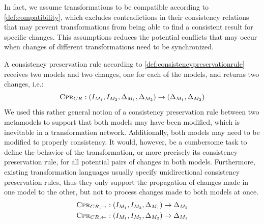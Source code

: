 In fact, we assume transformations to be compatible according to \autoref{def:compatibility}, which excludes contradictions in their consistency relations that may prevent transformations from being able to find a consistent result for specific changes.
This assumptions reduces the potential conflicts that may occur when changes of different transformations need to be synchronized.




A consistency preservation rule according to \autoref{def:consistencypreservationrule} receives two models and two changes, one for each of the models, and returns two changes, i.e.:
\begin{align*}
    \textsc{Cpr}_{CR_{}} : (I_{M_{1}}, I_{M_{2}}, \Delta_{M_{1}}, \Delta_{M_{2}}) \rightarrow (\Delta_{M_{1}}, \Delta_{M_{2}})
\end{align*}
We used this rather general notion of a consistency preservation rule between two metamodels to support that both models may have been modified, which is inevitable in a transformation network.
Additionally, both models may need to be modified to properly consistency.
It would, however, be a cumbersome task to define the behavior of the transformation, or more precisely its consistency preservation rule, for all potential pairs of changes in both models.
Furthermore, existing transformation languages usually specify unidirectional consistency preservation rules, thus they only support the propagation of changes made in one model to the other, but not to process changes made to both models at once.
\begin{align*}
    \textsc{Cpr}_{CR_{},\rightarrow} : (I_{M_{1}}, I_{M_{2}}, \Delta_{M_{1}}) \rightarrow \Delta_{M_{2}}\\
    \textsc{Cpr}_{CR_{},\leftarrow} : (I_{M_{1}}, I_{M_{2}}, \Delta_{M_{2}}) \rightarrow \Delta_{M_{1}}
\end{align*}

